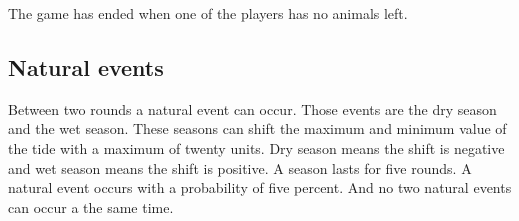 \documentclass[12pt]{article}
\begin{document}
The game has ended when one of the players has no animals left.

\subsection{Natural events}
Between two rounds a natural event can occur. Those events are the dry season and the wet season. These seasons can shift the maximum and minimum value of the tide with a maximum of twenty units. Dry season means the shift is negative and wet season means the shift is positive. A season lasts for five rounds. A natural event occurs with a probability of five percent. And no two natural events can occur a the same time.
\end{document}
